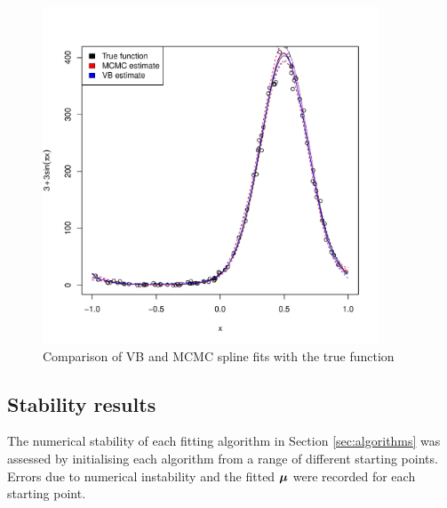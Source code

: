 \documentclass[times, doublespace]{anzsauth}
\begin{document}
	
	\begin{figure}
		\label{fig:spline}
		\caption{Comparison of VB and MCMC spline fits with the true function}
		\includegraphics[width=100mm, height=100mm]{code/results/accuracy_plots_spline_gva2.pdf}
	\end{figure}
	
	
	\subsection{Stability results}
	
	The numerical stability of each fitting algorithm in Section \ref{sec:algorithms} was assessed by initialising
	each algorithm from a range of different starting points. Errors due to numerical instability and the fitted
	${\boldsymbol \mu}$ were recorded for each starting point.
	
\end{document}
